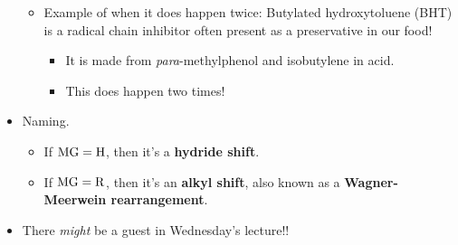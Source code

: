 \documentclass[../notes.tex]{subfiles}
\begin{document}
\begin{itemize}
\begin{itemize}
        \item Example of when it does happen twice: Butylated hydroxytoluene (BHT) is a radical chain inhibitor often present as a preservative in our food!
        \begin{itemize}
            \item It is made from \emph{para}-methylphenol and isobutylene in acid.
            \item This does happen two times!
        \end{itemize}
    \end{itemize}
    \item Naming.
    \begin{itemize}
        \item If $\ce{MG}=\ce{H}$, then it's a \textbf{hydride shift}.
        \item If $\ce{MG}=\ce{R}$, then it's an \textbf{alkyl shift}, also known as a \textbf{Wagner-Meerwein rearrangement}.
    \end{itemize}
    \item There \emph{might} be a guest in Wednesday's lecture!!
\end{itemize}
\newpage
\end{document}
